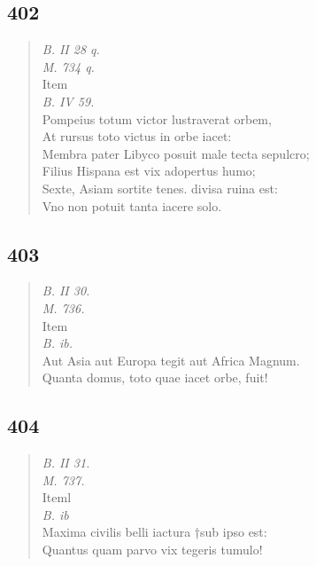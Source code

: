 \documentclass[11pt, a4paper]{report}
\begin{document}
            \subsection*{402}
      \begin{verse}
      \textit{B. II 28 q.} \\ \textit{M. 734 q.} \\  \lbrack Item \rbrack  \\ \textit{B. IV 59.} \\ Pompeius totum victor lustraverat orbem, \\ At rursus toto victus in orbe iacet: \\ Membra pater Libyco posuit male tecta sepulcro; \\ Filius Hispana est vix adopertus humo; \\ Sexte, Asiam sortite tenes. divisa ruina est: \\ Vno non potuit tanta iacere solo. \\ 
      \end{verse}
  
            \subsection*{403}
      \begin{verse}
      \textit{B. II 30.} \\ \textit{M. 736.} \\  \lbrack Item \rbrack  \\ \textit{B. ib.} \\ Aut Asia aut Europa tegit aut Africa Magnum. \\ Quanta domus, toto quae iacet orbe, fuit! \\ 
      \end{verse}
  
            \subsection*{404}
      \begin{verse}
      \textit{B. II 31.} \\ \textit{M. 737.} \\  \lbrack Iteml \\ \textit{B. ib} \\ Maxima civilis belli iactura †sub ipso est: \\ Quantus quam parvo vix tegeris tumulo! \\ 
      \end{verse}
  
\end{document}
